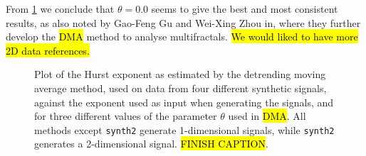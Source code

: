From \cref{fig:dma_performace} we conclude that $\theta = 0.0$ seems to give the best and most consistent results, as also noted by Gao-Feng Gu and Wei-Xing Zhou in\cite{gu2010detrending}, where they further develop the \hl{DMA} method to analyse multifractals. \hl{We would liked to have more 2D data references.}
%
\begin{figure}[htpb]%
    \centering%
    {
        \newcommand{\f}{\footnotesize}%
        \newcommand{\x}{\text}%
        \newcommand{\thislabelaaaaaa}{{\f $H_\x{in}=H_\x{out}$}}%
    }
    \caption{%
        Plot of the Hurst exponent as estimated by the detrending moving average method, used on data from four different synthetic signals, against the exponent used as input when generating the signals, and for three different values of the parameter $\theta$ used in \hl{DMA}. All methods except \texttt{synth2} generate 1-dimensional signals, while \texttt{synth2} generates a 2-dimensional signal. \hl{FINISH CAPTION}. %
        \label{fig:dma_performace}%
    }%
\end{figure}%

